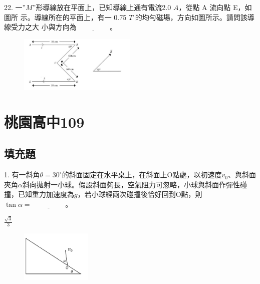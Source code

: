 \documentclass[cn,10pt,math=newtx]{elegantbook}
\begin{document}
\begin{example}
   22. 一$”M”$形導線放在平面上，已知導線上通有電流2.0 $A$，從點 A 流向點 E，如圖所
示。導線所在的平面上，有一 0.75 $T$ 的均勻磁場，方向如圖所示。請問該導線受力之大
小與方向為$\underline{\hspace{2cm}}$。\\
    \rightline{[桃園聯招教甄109]}
\end{example}
\begin{solution}
    
\end{solution}
\begin{figure}[htbp]
    \flushright
    \includegraphics[width=0.5\textwidth]{image/109桃聯22.png}
  \end{figure}
\newpage


\chapter{桃園高中109}
\section{填充題}


\begin{example}
   1. 有一斜角$\theta=30^\circ$的斜面固定在水平桌上，在斜面上O點處，以初速度$v_0$、與斜面夾角$\alpha$斜向拋射一小球。假設斜面夠長，空氣阻力可忽略，小球與斜面作彈性碰撞，已知重力加速度為$g$，若小球經兩次碰撞後恰好回到O點，則$\tan{\alpha} = \underline{\hspace{2cm}}$。\\
    \rightline{[桃園高中教甄109]}
\end{example}
\begin{solution}
    $\frac{\sqrt{3}}{3}$
\end{solution}
\begin{figure}[htbp]
    \flushright
    \includegraphics[width=0.3\textwidth]{image/109桃園1.png}
  \end{figure}
\newpage
\end{document}
